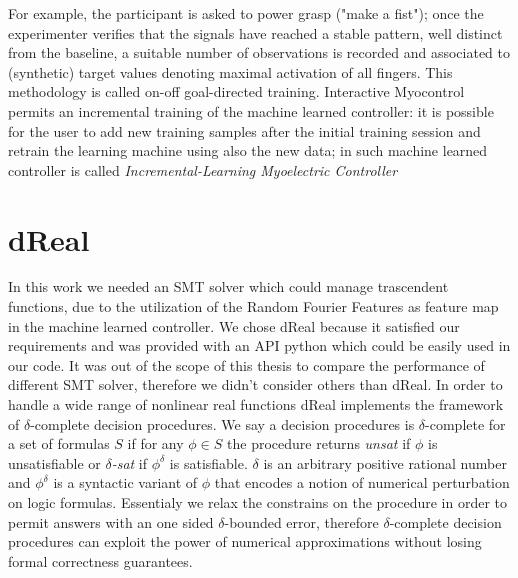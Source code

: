 For example, the participant is asked to power grasp ("make a fist"); once the experimenter verifies that the signals have reached a stable pattern, well distinct from the baseline, a suitable number of observations is recorded and associated to (synthetic) target values denoting maximal activation of all fingers. This methodology is called on-off goal-directed training.
Interactive Myocontrol permits an incremental training of the machine learned controller: it is possible for the user to add new training samples after the initial training session and retrain the learning machine using also the new data; in \cite{Strazzulla2017} such machine learned controller is called \textit{Incremental-Learning Myoelectric Controller}
\section{dReal}\label{sec:dReal}
In this work we needed an SMT solver which could manage trascendent functions, due to the utilization of the Random Fourier Features as feature map in the machine learned controller. We chose dReal \cite{gao2013dreal} because it satisfied our requirements and was provided with an API python which could be easily used in our code. It was out of the scope of this thesis to compare the performance of different SMT solver, therefore we didn't consider others than dReal.
In order to handle a wide range of nonlinear real functions dReal implements the framework of $\delta$-complete decision procedures. We say a decision procedures is $\delta$-complete for a set of formulas $S$ if for any $\phi \in S$ the procedure returns \textit{unsat} if $\phi$ is unsatisfiable or \textit{$\delta$-sat} if $\phi^\delta$ is satisfiable.
$\delta$ is an arbitrary positive rational number and $\phi^\delta$ is a syntactic variant of $\phi$ that encodes a notion of numerical perturbation on logic formulas. Essentialy we relax the constrains on the procedure in order to permit answers with an one sided $\delta$-bounded error, therefore $\delta$-complete decision procedures can exploit the power of numerical approximations without losing formal correctness guarantees.